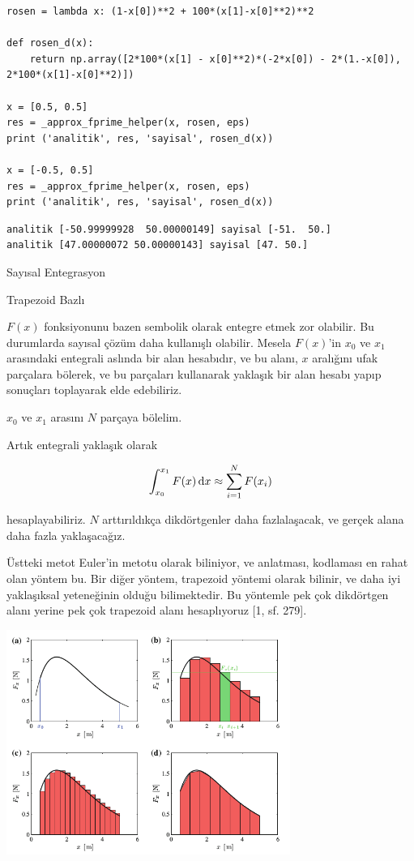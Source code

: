 \documentclass[12pt,fleqn]{article}\usepackage{../../common}
\begin{document}
\begin{verbatim}
rosen = lambda x: (1-x[0])**2 + 100*(x[1]-x[0]**2)**2

def rosen_d(x):
    return np.array([2*100*(x[1] - x[0]**2)*(-2*x[0]) - 2*(1.-x[0]), 2*100*(x[1]-x[0]**2)])

x = [0.5, 0.5]
res = _approx_fprime_helper(x, rosen, eps)
print ('analitik', res, 'sayisal', rosen_d(x))

x = [-0.5, 0.5]
res = _approx_fprime_helper(x, rosen, eps)
print ('analitik', res, 'sayisal', rosen_d(x))
\end{verbatim}

\begin{verbatim}
analitik [-50.99999928  50.00000149] sayisal [-51.  50.]
analitik [47.00000072 50.00000143] sayisal [47. 50.]
\end{verbatim}

Sayısal Entegrasyon

Trapezoid Bazlı

$F(x)$ fonksiyonunu bazen sembolik olarak entegre etmek zor olabilir. Bu
durumlarda sayısal çözüm daha kullanışlı olabilir. Mesela $F(x)$'in $x_0$
ve $x_1$ arasındaki entegrali aslında bir alan hesabıdır, ve bu alanı, $x$
aralığını ufak parçalara bölerek, ve bu parçaları kullanarak yaklaşık bir
alan hesabı yapıp sonuçları toplayarak elde edebiliriz. 

$x_0$ ve $x_1$ arasını $N$ parçaya bölelim. 

Artık entegrali yaklaşık olarak 

$$
\int_{x_0}^{x_1} F(x) \,\mathrm{d} x \approx \sum_{i=1}^{N} F(x_i)
$$

hesaplayabiliriz. $N$ arttırıldıkça dikdörtgenler daha fazlalaşacak, ve
gerçek alana daha fazla yaklaşacağız. 

Üstteki metot Euler'in metotu olarak biliniyor, ve anlatması, kodlaması en
rahat olan yöntem bu. Bir diğer yöntem, trapezoid yöntemi olarak bilinir,
ve daha iyi yaklaşıksal yeteneğinin olduğu bilimektedir. Bu yöntemle pek
çok dikdörtgen alanı yerine pek çok trapezoid alanı hesaplıyoruz [1,
sf. 279].

\includegraphics[width=25em]{compscieng_app01numint_01.png}
\end{document}
